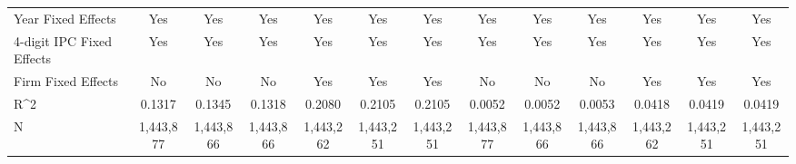 {\begin{tabular}{l*{12}{c}}
Year Fixed Effects  &         Yes   &         Yes   &         Yes   &         Yes   &         Yes   &         Yes   &         Yes   &         Yes   &         Yes   &         Yes   &         Yes   &         Yes   \\
4-digit IPC Fixed Effects&         Yes   &         Yes   &         Yes   &         Yes   &         Yes   &         Yes   &         Yes   &         Yes   &         Yes   &         Yes   &         Yes   &         Yes   \\
Firm Fixed Effects  &          No   &          No   &          No   &         Yes   &         Yes   &         Yes   &          No   &          No   &          No   &         Yes   &         Yes   &         Yes   \\
R^2                 &      0.1317   &      0.1345   &      0.1318   &      0.2080   &      0.2105   &      0.2105   &      0.0052   &      0.0052   &      0.0053   &      0.0418   &      0.0419   &      0.0419   \\
N                   &   1,443,877   &   1,443,866   &   1,443,866   &   1,443,262   &   1,443,251   &   1,443,251   &   1,443,877   &   1,443,866   &   1,443,866   &   1,443,262   &   1,443,251   &   1,443,251   \\
\hline\hline
\end{tabular}
}
